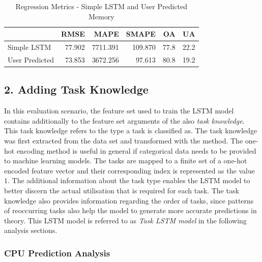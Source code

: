       \begin{table}
        \centering
        \caption{Regression Metrics - Simple LSTM and User Predicted Memory}
        \label{tab:regression-metrics-simple-lstm-user-predicted-memory}

        \begin{tabular}{|l|rrrrr|}
          \toprule
          {} &    RMSE &      MAPE &    SMAPE &    OA &    UA \\
          \midrule
          Simple LSTM &  77.902 &  7711.391 &  109.870 &  77.8 &  22.2 \\
          User Predicted  &  73.853 &  3672.256 &   97.613 &  80.8 &  19.2 \\
          \bottomrule
        \end{tabular}
      \end{table}

  \subsection*{2. Adding Task Knowledge}
  \label{sec:adding-task-knowledge-evaluation-scenarios}

    In this evaluation scenario, the feature set used to train the LSTM model contains additionally to the feature set arguments of the  also \emph{task knowledge}. This task knowledge refers to the type a task is classified as. The task knowledge was first extracted from the data set and transformed with the  method. 
    The one-hot encoding method is useful in general if categorical data needs to be provided to machine learning models.
    The tasks are mapped to a finite set of a one-hot encoded feature vector and their corresponding index is represented as the value $1$.
    The additional information about the task type enables the LSTM model to better discern the actual utilisation that is required for each task.
    The task knowledge also provides information regarding the order of tasks, since patterns of reoccurring tasks also help the model to generate more accurate predictions in theory.
    This LSTM model is referred to as \emph{Task LSTM model} in the following analysis sections.    


    \subsubsection{CPU Prediction Analysis}
    \label{sec:cpu-prediction-analysis-task-knowledge-lstm-evaluation}

